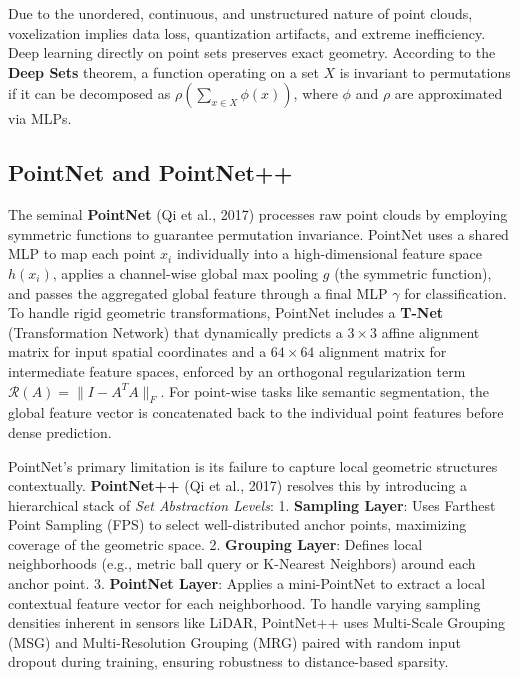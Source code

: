 Due to the unordered, continuous, and unstructured nature of point clouds, voxelization implies data loss, quantization artifacts, and extreme inefficiency. Deep learning directly on point sets preserves exact geometry.
According to the \textbf{Deep Sets} theorem, a function operating on a set $X$ is invariant to permutations if it can be decomposed as $\rho \left( \sum_{x \in X} \phi(x) \right)$, where $\phi$ and $\rho$ are approximated via MLPs.

\subsection{PointNet and PointNet++}
The seminal \textbf{PointNet} (Qi et al., 2017) processes raw point clouds by employing symmetric functions to guarantee permutation invariance. PointNet uses a shared MLP to map each point $x_i$ individually into a high-dimensional feature space $h(x_i)$, applies a channel-wise global max pooling $g$ (the symmetric function), and passes the aggregated global feature through a final MLP $\gamma$ for classification. 
To handle rigid geometric transformations, PointNet includes a \textbf{T-Net} (Transformation Network) that dynamically predicts a $3 \times 3$ affine alignment matrix for input spatial coordinates and a $64 \times 64$ alignment matrix for intermediate feature spaces, enforced by an orthogonal regularization term $\mathcal{R}(A) = \|I - A^T A\|_F$. For point-wise tasks like semantic segmentation, the global feature vector is concatenated back to the individual point features before dense prediction.

PointNet's primary limitation is its failure to capture local geometric structures contextually. \textbf{PointNet++} (Qi et al., 2017) resolves this by introducing a hierarchical stack of \textit{Set Abstraction Levels}:
1. \textbf{Sampling Layer}: Uses Farthest Point Sampling (FPS) to select well-distributed anchor points, maximizing coverage of the geometric space.
2. \textbf{Grouping Layer}: Defines local neighborhoods (e.g., metric ball query or K-Nearest Neighbors) around each anchor point.
3. \textbf{PointNet Layer}: Applies a mini-PointNet to extract a local contextual feature vector for each neighborhood.
To handle varying sampling densities inherent in sensors like LiDAR, PointNet++ uses Multi-Scale Grouping (MSG) and Multi-Resolution Grouping (MRG) paired with random input dropout during training, ensuring robustness to distance-based sparsity.

